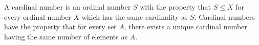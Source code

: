 \documentclass[12pt]{article}
\begin{document}
A cardinal number is an ordinal number $S$ with the property that $S \leq X$ for every ordinal number $X$ which has the same cardinality as $S$. Cardinal numbers have the property that for every set $A$, there exists a unique cardinal number having the same number of elements as $A$.

\end{document}
